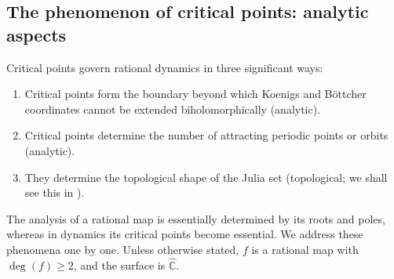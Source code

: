 \documentclass[11pt,a4paper]{article}
\begin{document}
\subsection{The phenomenon of critical points: analytic aspects}
Critical points govern rational dynamics in three significant ways:
\begin{enumerate}
\setcounter{enumi}{0}\item Critical points form the boundary beyond which Koenigs and B\"ottcher coordinates cannot be extended biholomorphically (analytic).
\setcounter{enumi}{1}\item Critical points determine the number of attracting periodic points or orbits (analytic).
\setcounter{enumi}{2}\item They determine the topological shape of the Julia set (topological; we shall see this in ).
\end{enumerate}
The analysis of a rational map is essentially determined by its roots and poles, whereas in dynamics its critical points become essential. We address these phenomena one by one. Unless otherwise stated, $f$ is a rational map with $\deg(f)\ge2$, and the surface is $\widehat{\mathbb C}$.
\end{document}
